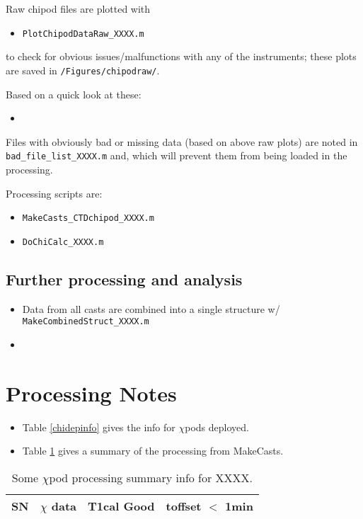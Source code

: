 \documentclass[11pt]{article}
\begin{document}
Raw chipod files are plotted with 
\begin{itemize}
\item \verb+PlotChipodDataRaw_XXXX.m+
\end{itemize}
to check for obvious issues/malfunctions with any of the instruments; these plots are saved in \verb+/Figures/chipodraw/+. 

Based on a quick look at these:
\begin{itemize}
\item
\end{itemize}

Files with obviously bad or missing data (based on above raw plots) are noted in \verb+bad_file_list_XXXX.m+ and, which will prevent them from being loaded in the processing.

Processing scripts are:
\begin{itemize}
\item \verb+MakeCasts_CTDchipod_XXXX.m+
\item \verb+DoChiCalc_XXXX.m+
\end{itemize}

\subsection{Further processing and analysis}

\begin{itemize}
\item Data from all casts are combined into a single structure w/ \verb+MakeCombinedStruct_XXXX.m+
\item 
\end{itemize}


\newpage
\section{Processing Notes}

\begin{itemize}
\item Table \ref{chidepinfo} gives the info for $\chi$pods deployed.
\item Table \ref{procsum} gives a summary of the processing from MakeCasts.
\end{itemize}

\begin{table}[htdp]
\caption{Some $\chi$pod processing summary info for XXXX. }
\begin{center}
\begin{tabular}{|c|c|c|c|}
\hline
SN & $\chi$ data & T1cal Good & toffset $<$ 1min \\ 
\hline
\hline
\hline
\end{tabular}
\end{center}
\label{procsum}
\end{table}
\end{document}
